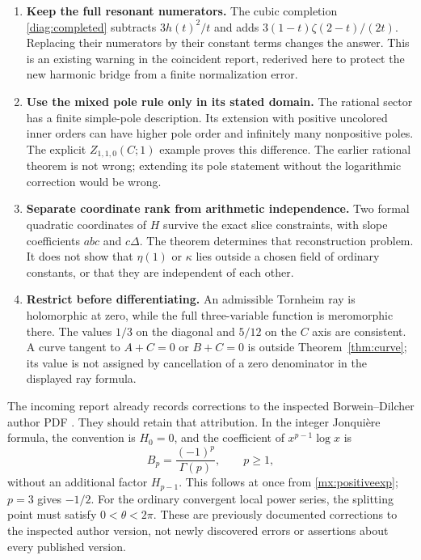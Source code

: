 \begin{enumerate}
\item \textbf{Keep the full resonant numerators.}
The cubic completion \eqref{diag:completed} subtracts
$3h(t)^2/t$ and adds $3(1-t)\zeta(2-t)/(2t)$.
Replacing their numerators by their constant terms changes the
answer. This is an existing warning in the coincident report,
rederived here to protect the new harmonic bridge from a finite
normalization error.
\item \textbf{Use the mixed pole rule only in its stated domain.}
The rational sector has a finite simple-pole description. Its
extension with positive uncolored inner orders can have higher
pole order and infinitely many nonpositive poles. The explicit
$Z_{1,1,0}(C;1)$ example proves this difference. The earlier
rational theorem is not wrong; extending its pole statement without
the logarithmic correction would be wrong.
\item \textbf{Separate coordinate rank from arithmetic independence.}
Two formal quadratic coordinates of $H$ survive the exact slice
constraints, with slope coefficients $abc$ and $c\Delta$.
The theorem determines that reconstruction problem. It does not
show that $\eta(1)$ or $\kappa$ lies outside a chosen field of
ordinary constants, or that they are independent of each other.
\item \textbf{Restrict before differentiating.}
An admissible Tornheim ray is holomorphic at zero, while the full
three-variable function is meromorphic there. The values $1/3$ on
the diagonal and $5/12$ on the $C$ axis are consistent. A curve
tangent to $A+C=0$ or $B+C=0$ is outside
Theorem~\ref{thm:curve}; its value is not assigned by cancellation
of a zero denominator in the displayed ray formula.
\end{enumerate}

The incoming report already records corrections to the inspected
Borwein--Dilcher author PDF \cite{IncomingCoincident,BorweinDilcher}.
They should retain that attribution. In the integer Jonqui\`ere
formula, the convention is $H_0=0$, and the coefficient of
$x^{p-1}\log x$ is
\[
 B_p=\frac{(-1)^p}{\Gamma(p)},\qquad p\ge1,
\]
without an additional factor $H_{p-1}$. This follows at once from
\eqref{mx:positiveexp}; $p=3$ gives $-1/2$.
For the ordinary convergent local power series, the splitting point
must satisfy $0<\theta<2\pi$. These are previously documented
corrections to the inspected author version, not newly discovered
errors or assertions about every published version.


